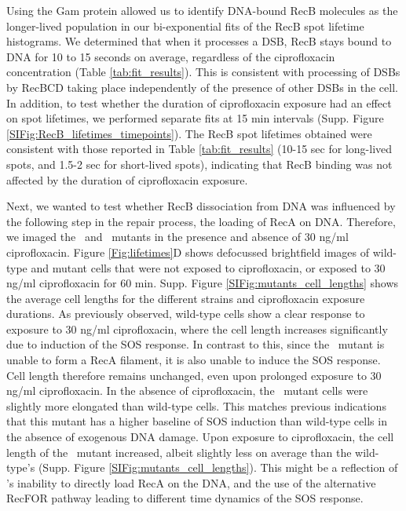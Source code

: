 Using the Gam protein allowed us to identify DNA-bound RecB molecules as the longer-lived population in our bi-exponential fits of the RecB spot lifetime histograms. We determined that when it processes a DSB, RecB stays bound to DNA for 10 to 15 seconds on average, regardless of the ciprofloxacin concentration (Table \ref{tab:fit_results}). This is consistent with processing of DSBs by RecBCD taking place independently of the presence of other DSBs in the cell. In addition, to test whether the duration of ciprofloxacin exposure had an effect on spot lifetimes, we performed separate fits at 15 min intervals (Supp. Figure \ref{SIFig:RecB_lifetimes_timepoints}). The RecB spot lifetimes obtained were consistent with those reported in Table \ref{tab:fit_results} (10-15 sec for long-lived spots, and 1.5-2 sec for short-lived spots), indicating that RecB binding was not affected by the duration of ciprofloxacin exposure.

Next, we wanted to test whether RecB dissociation from DNA was influenced by the following step in the repair process, the loading of RecA on DNA. Therefore, we imaged the \dreca\ and \geneteneighty\ mutants in the presence and absence of 30 ng/ml ciprofloxacin. Figure \ref{Fig:lifetimes}D shows defocussed brightfield images of wild-type and mutant cells that were not exposed to ciprofloxacin, or exposed to 30 ng/ml ciprofloxacin for 60 min. Supp. Figure \ref{SIFig:mutants_cell_lengths} shows the average cell lengths for the different strains and ciprofloxacin exposure durations. As previously observed, wild-type cells show a clear response to exposure to 30 ng/ml ciprofloxacin, where the cell length increases significantly due to induction of the SOS response. In contrast to this, since the \dreca\ mutant is unable to form a RecA filament, it is also unable to induce the SOS response. Cell length therefore remains unchanged, even upon prolonged exposure to 30 ng/ml ciprofloxacin. In the absence of ciprofloxacin, the \geneteneighty\ mutant cells were slightly more elongated than wild-type cells. This matches previous indications that this mutant has a higher baseline of SOS induction than wild-type cells in the absence of exogenous DNA damage\cite{Lepore2023}. Upon exposure to ciprofloxacin, the cell length of the \geneteneighty\ mutant increased, albeit slightly less on average than the wild-type's (Supp. Figure \ref{SIFig:mutants_cell_lengths}). This might be a reflection of \teneighty's inability to directly load RecA on the DNA, and the use of the alternative RecFOR pathway leading to different time dynamics of the SOS response\cite{Ivancic-Bace_2003,Lepore2023}.

